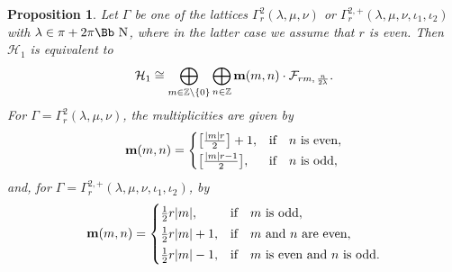 \documentclass[pdftex]{sigma}
\newcommand\NN{{\mbox{\Bb N}}}
\newcommand\Z{{\mathbb Z}}
\newcommand\bm{\textbf{{\rm \textbf{m}}}}
\newcommand\cH{{\mathcal H}}
\newcommand\cF{{\mathcal F}}
\numberwithin{equation}{section}
\newtheorem{Proposition}[Theorem]{Proposition}
 { \theoremstyle{definition}
\newtheorem{Definition}[Theorem]{Definition}
\newtheorem{Note}[Theorem]{Note}
\newtheorem{Example}[Theorem]{Example}
\newtheorem{Remark}[Theorem]{Remark} }
\begin{document}
\begin{Proposition} \label{P1}
Let $\Gamma$ be one of the lattices $\Gamma_r^2(\lambda,\mu,\nu)$ or $\Gamma_r^{2,+}(\lambda,\mu,\nu,\iota_1,\iota_2)$ with $\lambda\in\pi+2\pi\NN$, where in the latter case we assume that $r$ is even.
Then $\cH_1$ is equivalent to
\begin{gather*}
\cH_1\cong\bigoplus_{m\in \Z\backslash\{0\}} \bigoplus_{n\in\Z} \bm(m,n)\cdot \cF_{rm,\,\frac n{2\lambda}}.
\end{gather*}
For $\Gamma=\Gamma_r^2(\lambda,\mu,\nu)$, the multiplicities are given by
\begin{gather*}
\bm(m,n) =\begin{cases}
\big[\frac{|m|r}2\big]+1,& \text{if\quad $n$ is even},
\\[.5ex]
\big[\frac{|m|r-1}2\big],& \text{if\quad $n$ is odd},
\end{cases}
\end{gather*}
and, for $\Gamma=\Gamma_r^{2,+}(\lambda,\mu,\nu,\iota_1,\iota_2)$, by
\begin{gather*}
\bm(m,n) =
\begin{cases}
 \frac12 r|m|, &\text{if\quad $m$ is odd},
 \\[0.5ex]
 \frac12 r|m| +1,&\text{if\quad $m$ and $n$ are even},
 \\[0.5ex]
 \frac12 r|m| -1, &\text{if\quad $m$ is even and $n$ is odd}.
 \end{cases}
 \end{gather*}
\end{Proposition}
\end{document}

